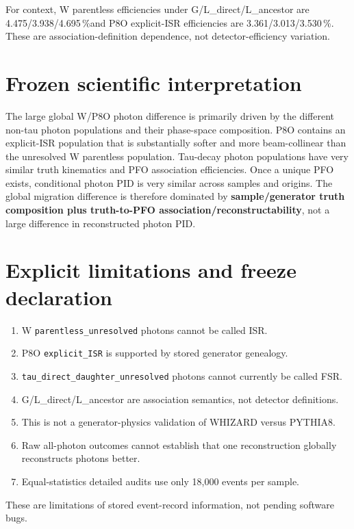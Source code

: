 \documentclass[11pt,a4paper]{article}
\newcommand{\pct}{\,\%}
\newcommand{\code}[1]{\texttt{#1}}
\begin{document}
For context, W parentless efficiencies under G/L\_direct/L\_ancestor are 4.475/3.938/4.695\pct and P8O explicit-ISR efficiencies are 3.361/3.013/3.530\pct. These are association-definition dependence, not detector-efficiency variation.

\section{Frozen scientific interpretation}

The large global W/P8O photon difference is primarily driven by the different non-tau photon populations and their phase-space composition. P8O contains an explicit-ISR population that is substantially softer and more beam-collinear than the unresolved W parentless population. Tau-decay photon populations have very similar truth kinematics and PFO association efficiencies. Once a unique PFO exists, conditional photon PID is very similar across samples and origins. The global migration difference is therefore dominated by \textbf{sample/generator truth composition plus truth-to-PFO association/reconstructability}, not a large difference in reconstructed photon PID.

\section{Explicit limitations and freeze declaration}

\begin{enumerate}
\item W \code{parentless\_unresolved} photons cannot be called ISR.
\item P8O \code{explicit\_ISR} is supported by stored generator genealogy.
\item \code{tau\_direct\_daughter\_unresolved} photons cannot currently be called FSR.
\item G/L\_direct/L\_ancestor are association semantics, not detector definitions.
\item This is not a generator-physics validation of WHIZARD versus PYTHIA8.
\item Raw all-photon outcomes cannot establish that one reconstruction globally reconstructs photons better.
\item Equal-statistics detailed audits use only 18,000 events per sample.
\end{enumerate}

These are limitations of stored event-record information, not pending software bugs.
\end{document}
